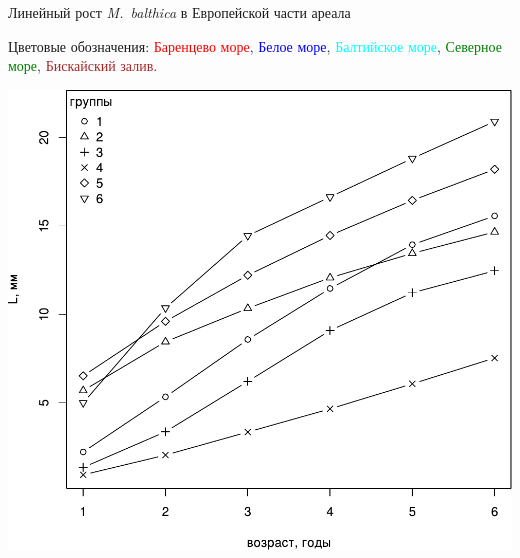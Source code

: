 \documentclass{beamer}
\begin{document}
\begin{frame}{Линейный рост {\it M.~balthica} в Европейской части ареала}
\begin{minipage}[t]{.52\linewidth}
Цветовые обозначения: \textcolor{red}{Баренцево море}, 
\textcolor{blue}{Белое море}, 
\textcolor{cyan}{Балтийское море}, 
\textcolor{green}{Северное море}, 
\textcolor{brown}{Бискайский залив}.
	\end{minipage}
%
	\begin{minipage}[t]{.45\linewidth}
		\begin{center}
			\includegraphics[width=\textwidth]{./Europe_growth_groups1.pdf}
		\end{center}
	\end{minipage}
\end{frame}
\end{document}

